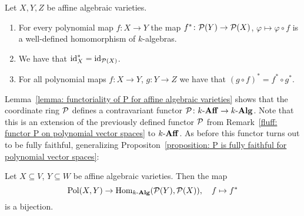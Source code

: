\begin{lemma}
  \label{lemma: functoriality of P for affine algebraic varieties}
  Let $X, Y, Z$ be affine algebraic varieties.
  \begin{enumerate}
    \item
      For every polynomial map $f \colon X \to Y$ the map $f^* \colon \mathcal{P}(Y) \to \mathcal{P}(X)$, $\varphi \mapsto \varphi \circ f$ is a well-defined homomorphism of $k$-algebras.
    \item
      We have that $\operatorname{id}_X^* = \operatorname{id}_{\mathcal{P}(X)}$.
    \item
      For all polynomial maps $f \colon X \to Y$, $g \colon Y \to Z$ we have that $(g \circ f)^* = f^* \circ g^*$.
  \end{enumerate}
\end{lemma}


\begin{remark}
  Lemma~\ref{lemma: functoriality of P for affine algebraic varieties} shows that the coordinate ring $\mathcal{P}$ defines a contravariant functor $\mathcal{P} \colon k\text{-}\mathbf{Aff} \to k\text{-}\mathbf{Alg}$.
  Note that this is an extension of the previously defined functor $\mathcal{P}$ from Remark~\ref{fluff: functor P on polynomial vector spaces} to $k\text{-}\mathbf{Aff}$.
  As before this functor turns out to be fully faithful, generalizing Propositon~\ref{proposition: P is fully faithful for polynomial vector spaces}:
\end{remark}


\begin{proposition}
  \label{proposition: P is fully faithful for affine varieties}
  Let $X \subseteq V$, $Y \subseteq W$ be affine algebraic varieties.
  Then the map
  \[
            \operatorname{Pol}(X, Y)
    \to     \operatorname{Hom}_{k\text{-}\mathbf{Alg}}(\mathcal{P}(Y), \mathcal{P}(X)),
    \quad   f
    \mapsto f^*
  \]
  is a bijection.
\end{proposition}



